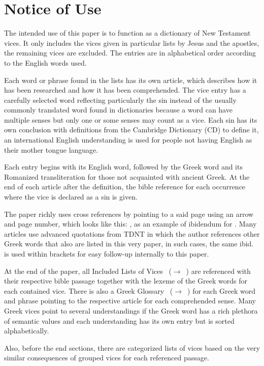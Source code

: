 \section{Notice of Use}

The intended use of this paper is to function as a dictionary of New Testament vices. It only includes the vices given in particular lists by Jesus and the apostles, the remaining vices are excluded. The entries are in alphabetical order according to the 
 English words used. 
 
 Each word or phrase found in the lists has its own article,
 which describes how it has been researched and how it has been comprehended. The vice entry has a carefully selected
 word reflecting particularly the sin instead of the usually commonly translated word found in dictionaries
 because a word can have multiple senses but only one or some senses may count as a vice. Each sin has its own conclusion
 with definitions from the Cambridge Dictionary (CD) to define it, an international English understanding is used for 
 people not having English as their mother tongue language. 
 
 Each entry begins with its English word, followed by 
 the Greek word and its Romanized transliteration for those not acquainted with ancient Greek. At the end of each
 article after the definition, the bible reference for each occurrence where the vice is declared as a sin is given.
 
The paper richly uses cross references by pointing to a said page using an arrow and page number, which looks like 
this: , as an example of ibidendum for .
Many articles use advanced quotations from TDNT in which the author references other Greek words that also are listed
in this very paper, in such cases, the same ibid. is used within brackets for easy follow-up internally to this paper.
 
 At the end of the paper, all Included Lists of Vices ~($\rightarrow$~\pageref{inc_list_vices}) are referenced with their respective bible passage together with the 
 lexeme of the Greek words for each contained vice.
 There is also a Greek Glossary ~($\rightarrow$~\pageref{grc_gloss}) for each Greek word and phrase pointing to the respective article for each comprehended sense. 
 Many Greek vices point to several understandings if the Greek word has a rich plethora of semantic values and each 
 understanding has its own entry but is sorted alphabetically.
 
 Also, before the end sections, there are categorized lists of vices based on the very similar consequences of grouped
 vices for each referenced passage.  
   
   
   
